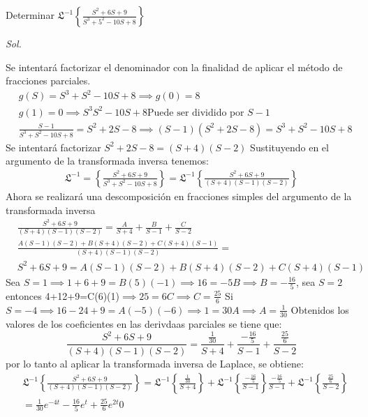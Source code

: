 \begin{example}
    Determinar $\mathfrak{L}^{-1}\left\{\frac{S^2+6S+9}{S^3+5^2-10S+8}\right\}$
\end{example}
\textit{ Sol. }

Se intentará factorizar el denominador con la finalidad de aplicar el método de fracciones parciales.
\begin{align*}
    &g(S) = S^3 +S^2 - 10S +8\implies g(0)=8\\
    &g(1)= 0\implies S^3 S^2 - 10S + 8 \text{Puede ser dividido por }S-1\\
    &\frac{S-1}{S^3 +S^2 - 10S + 8} = S^2 + 2S - 8\implies (S -1)\left(S^2 + 2S - 8\right) = S^3 + S^2 -10S + 8
\end{align*}
Se intentará factorizar $S^2 + 2S - 8= \left(S+4\right)\left(S-2\right)$
Sustituyendo en el argumento de la transformada inversa tenemos:
\begin{align*}
    \mathfrak{L}^{ - 1} =\left\{\frac{S^2 +6S + 9}{S^3 +S^2 - 10S + 8}\right\} = \mathfrak{L}^{ -1}\left\{\frac{S^2 + 6S +9}{(S +4)(S -1)(S - 2)}\right\}
\end{align*}
Ahora se realizará una descomposición en fracciones simples del argumento de la transformada inversa
\begin{align*}
    &\frac{S^2 + 6S +9}{(S + 4)(S - 1)(S - 2)} = \frac{A}{S +4} + \frac{B}{S - 1} + \frac{C}{S - 2}\\
    &\frac{A(S - 1)(S - 2) + B(S + 4)(S - 2) + C(S + 4)(S - 1)}{(S + 4)(S - 1)(S - 2)} = \\
    &S^2 + 6S + 9 = A(S - 1)(S - 2) + B(S + 4)(S - 2) + C(S + 4)(S - 1)
\end{align*}
Sea $S=1\implies 1+6+9= B(5)(-1)\implies 16=-5B\implies B= -\frac{16}{5}$, sea $S=2$ entonces 4+12+9=C(6)(1)$\implies25=6C\implies C=\frac{25}{6}$
Si $S=-4\implies 16-24+9=A(-5)(-6)\implies 1=30A\implies A=\frac{1}{30}$
Obtenidos los valores de los coeficientes en las derivdaas parciales se tiene que:
\begin{equation*}
    \frac{S^2 + 6S +9}{(S + 4)(S - 1)(S - 2)} = \frac{\frac{1}{30}}{S +4} + \frac{-\frac{16}{5}}{S - 1} + \frac{\frac{25}{6}}{S - 2}
\end{equation*}
por lo tanto al aplicar la transformada inversa de Laplace, se obtiene:
\begin{align*}
    &\mathfrak{L}^{ -1}\left\{\frac{S^2 + 6S +9}{(S + 4)(S - 1)(S - 2)}\right\}= \mathfrak{L}^{ -1}\left\{\frac{\frac{1}{30}}{S +4}\right\} + \mathfrak{L}^{-1}\left\{\frac{ - \frac{16}{5}}{S - 1}\right\}\frac{-\frac{16}{5}}{S - 1} + \mathfrak{L}^{ -1}\left\{\frac{\frac{25}{6}}{S - 2}\right\}\\
    &= \frac{1}{30}e^{ - 4t} - \frac{16}{5}e^{t} + \frac{25}{6}e^{2t}0\\
\end{align*}

